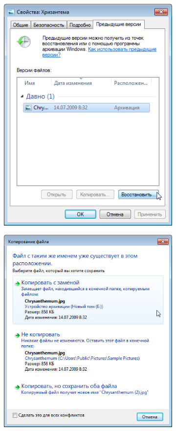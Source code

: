 \documentclass[
	a4paper,
	oneside,
	BCOR = 10mm,
	DIV = 12,
	12pt,
	headings = normal,
]{scrartcl}
\newlength{\gridunitwidth}
\begin{document}
				\begin{figure}[!htbp]
					\begin{subfigure}[b]{5\gridunitwidth}
						\includegraphics[height=12\baselineskip]{./assets/y04s01-infosec-lab-01-03-p13.png}
						\caption{}
						\label{subfig:03-previous-versions-01-01}
					\end{subfigure}%
					\hspace{2\gridunitwidth}%
					\begin{subfigure}[b]{5\gridunitwidth}
						\includegraphics[height=12\baselineskip]{./assets/y04s01-infosec-lab-01-03-p14.png}

\end{subfigure}
\end{figure}
\end{document}
